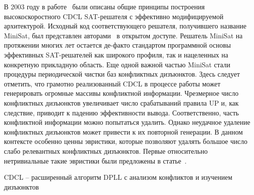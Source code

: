 В 2003 году в работе~\cite{minisat} были описаны общие принципы построения высокоскоростного CDCL SAT-решателя с эффективно модифицируемой архитектурой.
Исходный код соответствующего решателя, получившего название MiniSat, был представлен авторами~\cite{minisat} в открытом доступе.
Решатель MiniSat на протяжении многих лет остается де-факто стандартом программной основы эффективных SAT-решателей как широкого профиля, так и нацеленных на конкретную прикладную область.
Еще одной важной частью MiniSat стали процедуры периодической чистки баз конфликтных дизъюнктов.
Здесь следует отметить, что грамотно реализованный CDCL в процессе работы может генерировать огромные массивы конфликтной информации.
Чрезмерное число конфликтных дизъюнктов увеличивает число срабатываний правила UP и, как следствие, приводит к падению эффективности вывода.
Соответственно, часть конфликтной информации можно попытаться удалить.
Однако неудачное удаление конфликтных дизъюнктов может привести к их повторной генерации.
В данном контексте особенно ценны эвристики, которые позволяют удалять большое число слабо релевантных конфликтных дизъюнктов.
Первые относительно нетривиальные такие эвристики были предложены в статье~\cite{glucose}.

\begin{algorithm}[!ht]
    \caption{CDCL \--- расширенный алгоритм DPLL с анализом конфликтов и изучением дизъюнктов}
    \label{alg:cdcl}
    \DontPrintSemicolon



\end{algorithm}


